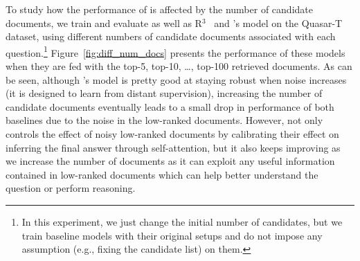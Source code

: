 To study how the performance of \tracrnet is affected by the number of candidate documents, we train and evaluate \tracrnet as well as R$^3$~\citep{wang2017r} and \citet{lin2018denoising}'s model on the Quasar-T dataset, using different numbers of candidate documents associated with each question.\footnote{In this experiment, we just change the initial number of candidates, but we train baseline models with their original setups and do not impose any assumption (e.g., fixing the candidate list) on them.}
%
Figure~\ref{fig:diff_num_docs} presents the performance of these models when they are fed with the top-5, top-10, \ldots, top-100 retrieved documents. 
%
As can be seen, although \citet{lin2018denoising}'s model is pretty good at staying robust when noise increases (it is designed to learn from distant supervision), increasing the number of candidate documents eventually leads to a small drop in performance of both baselines due to the noise in the low-ranked documents. 
However, \tracrnet not only controls the effect of noisy low-ranked documents by calibrating their effect on inferring the final answer through self-attention, but it also keeps improving as we increase the number of documents as it can exploit any useful information contained in low-ranked documents which can help better understand the question or perform reasoning.



